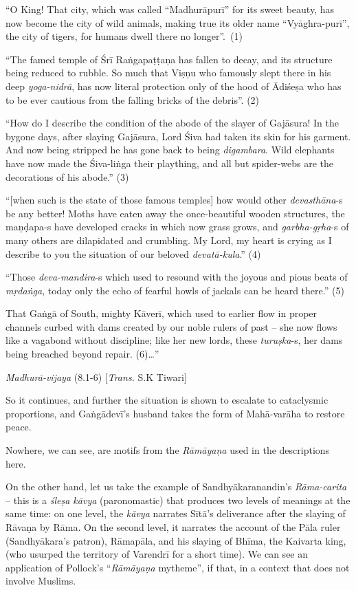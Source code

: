 \begin{myquote}
“O King! That city, which was called “Madhurāpurī” for its sweet beauty, has now become the city of wild animals, making true its older name “Vyāghra-purī”, the city of tigers, for humans dwell there no longer”.~(1) 

“The famed temple of Śrī Raṅgapaṭṭaṇa has fallen to decay, and its structure being reduced to rubble. So much that Viṣṇu who famously slept there in his deep {\sl yoga-nidrā}, has now literal protection only of the hood of Ādiśeṣa who has to be ever cautious from the falling bricks of the debris”. (2) 

“How do I describe the condition of the abode of the slayer of Gajāsura! In the bygone days, after slaying Gajāsura, Lord Śiva had taken its skin for his garment. And now being stripped he has gone back to being {\sl digambara}. Wild elephants have now made the Śiva-liṅga their plaything, and all but spider-webs are the decorations of his abode.” (3) 

“[when such is the state of those famous temples] how would other {\sl devasthāna}-s be any better! Moths have eaten away the once-beautiful wooden structures, the maṇḍapa-s have developed cracks in which now grass grows, and {\sl garbha-gṛha}-s of many others are dilapidated and crumbling. My Lord, my heart is crying as I describe to you the situation of our beloved {\sl devatā-kula}.” (4) 

“Those {\sl deva-mandira}-s which used to resound with the joyous and pious beats of {\sl mṛdaṅga}, today only the echo of fearful howls of jackals can be heard there.” (5) 

That Gaṅgā of South, mighty Kāverī, which used to earlier flow in proper channels curbed with dams created by our noble rulers of past – she now flows like a vagabond without discipline; like her new lords, these {\sl turuṣka}-s, her dams being breached beyond repair. (6)…” 

\hfill {\sl Madhurā-vijaya} (8.1-6) [{\sl Trans.} S.K  Tiwari]
\end{myquote}

So it continues, and further the situation is shown to escalate to cataclysmic proportions, and Gaṅgādevī’s husband takes the form of Mahā-varāha to restore peace. 

Nowhere, we can see, are motifs from the {\sl Rāmāyaṇa} used in the descriptions here.  

On the other hand, let us take the example of Sandhyākaranandin's {\sl Rāma-carita} – this is a {\sl śleṣa kāvya} (paronomastic) that produces two levels of meanings at the same time: on one level, the {\sl kāvya} narrates Sītā’s deliverance after the slaying of Rāvaṇa by Rāma.  On the second level, it narrates the account of the Pāla ruler (Sandhyākara’s patron), Rāmapāla, and his slaying of Bhīma, the Kaivarta king, (who usurped the territory of Varendrī for a short time). We can see an application of Pollock’s “{\sl Rāmāyaṇa} mytheme”, if that, in a context that does not involve Muslims. 

